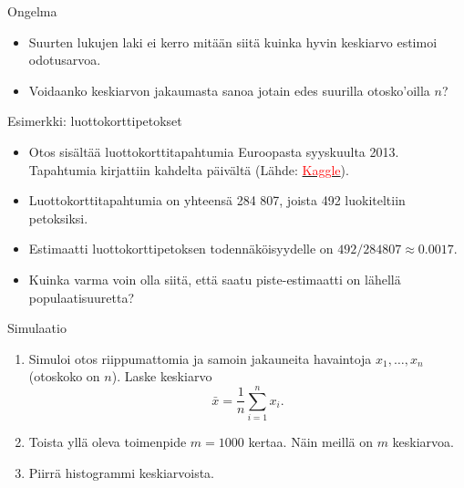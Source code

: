 \documentclass{beamer}
\begin{document}

\begin{frame}{Ongelma}
  \begin{itemize}
    \item Suurten lukujen laki ei kerro mitään siitä kuinka hyvin keskiarvo
    estimoi odotusarvoa.
    \pause
    \item Voidaanko keskiarvon jakaumasta sanoa jotain edes suurilla
    otosko'oilla $n$?
  \end{itemize} 
\end{frame}


\begin{frame}{Esimerkki: luottokorttipetokset}
  \begin{itemize}
    \item Otos sisältää luottokorttitapahtumia Euroopasta syyskuulta 2013.
    Tapahtumia kirjattiin kahdelta päivältä (Lähde:
    \href{https://www.kaggle.com/datasets/mlg-ulb/creditcardfraud?resource=download}{\textcolor{red}{Kaggle}}).
    \pause
    \item Luottokorttitapahtumia on yhteensä 284 807, joista 492 luokiteltiin
    petoksiksi.
    \pause
    \item Estimaatti luottokorttipetoksen todennäköisyydelle on $492 / 284
    807\approx 0.0017$.
    \pause
    \item Kuinka varma voin olla siitä, että saatu piste-estimaatti on lähellä
    populaatisuuretta?
  \end{itemize}
\end{frame}


\begin{frame}{Simulaatio}
  \begin{enumerate}
    \item Simuloi otos riippumattomia ja samoin jakauneita havaintoja $x_1,
    \ldots, x_n$ (otoskoko on $n$). Laske keskiarvo
    \begin{equation*}
      \bar x = \frac{1}{n}\sum_{i=1}^n x_i.
    \end{equation*}
    \pause
    \item Toista yllä oleva toimenpide $m = 1000$ kertaa. Näin meillä on $m$
    keskiarvoa.
    \pause
    \item Piirrä histogrammi keskiarvoista.
  \end{enumerate}
\end{frame}
\end{document}
